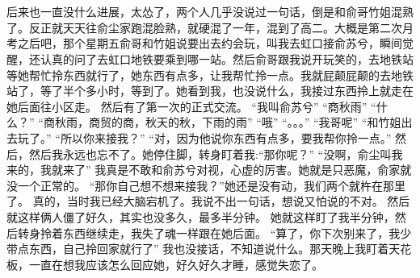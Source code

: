 \chapter{}
后来也一直没什么进展，太怂了，两个人几乎没说过一句话，倒是和俞哥竹姐混熟了。反正就天天往俞尘家跑混脸熟，就硬混了一年，混到了高二。大概是第二次月考之后吧，那个星期五俞哥和竹姐说要出去约会玩，叫我去虹口接俞苏兮，瞬间觉醒，还认真的问了去虹口地铁要乘到哪一站。然后俞哥跟我说开玩笑的，去地铁站等她帮忙拎东西就行了，她东西有点多，让我帮忙拎一点。我就屁颠屁颠的去地铁站了，等了半个多小时，等到了。她看到我，也没说什么，我接过东西拎上就走在她后面往小区走。
然后有了第一次的正式交流。
“我叫俞苏兮”
“商秋雨”
“什么？”
“商秋雨，商贸的商，秋天的秋，下雨的雨”
“哦”
“。。。”
“我哥呢”
“和竹姐出去玩了。”
“所以你来接我？”
“对，因为他说你东西有点多，要我帮你拎一点。”
然后，然后我永远也忘不了。她停住脚，转身盯着我:“那你呢？”
“没啊，俞尘叫我来的，我就来了”
我真是不敢和俞苏兮对视，心虚的厉害。她就是只恶魔，俞家就没一个正常的。
“那你自己想不想来接我？”她还是没有动，我们两个就杵在那里了。
真的，当时我已经大脑宕机了。我说不出一句话，想说又怕说的不对。
然后就这样俩人僵了好久，其实也没多久，最多半分钟。
她就这样盯了我半分钟，然后转身拎着东西继续走，我失了魂一样跟在她后面。
“算了，你下次别来了，我少带点东西，自己拎回家就行了”
我也没接话，不知道说什么。那天晚上我盯着天花板，一直在想我应该怎么回应她，好久好久才睡，感觉失恋了。

